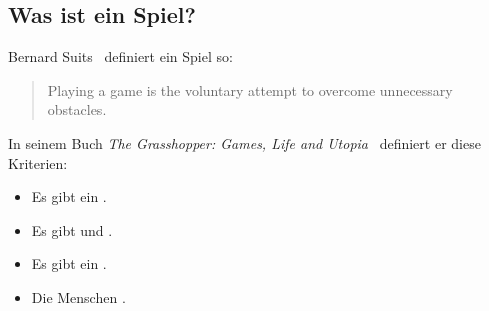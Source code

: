 \subsection{Was ist ein Spiel?}
\label{spiel-definition}

Bernard Suits~\cite{game-suits} definiert ein Spiel so:

\begin{quote}
  Playing a game is the voluntary attempt to overcome unnecessary obstacles.
\end{quote}

In seinem Buch \emph{The Grasshopper: Games, Life and Utopia}~\cite{suits-grashopper} definiert er diese Kriterien:

\begin{itemize}
  \item Es gibt ein .
  \item Es gibt  und .
  \item Es gibt ein .
  \item Die Menschen .
\end{itemize}
